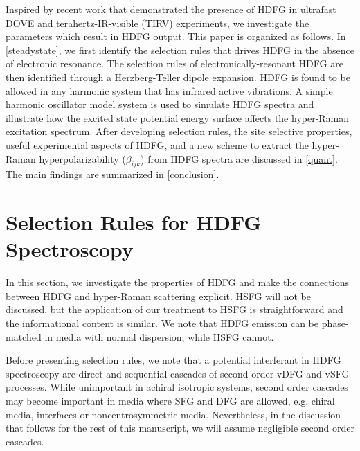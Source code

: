 \documentclass[aip, jcp, reprint, onecolumn]{revtex4-2}
\begin{document}
Inspired by recent work that demonstrated the presence of HDFG in ultrafast DOVE and terahertz-IR-visible (TIRV) experiments, we investigate the parameters which result in HDFG output. \cite{Bonn2024, McDonnell2024}
This paper is organized as follows.
In \autoref{steadystate}, we first identify the selection rules that drives HDFG in the absence of electronic resonance. 
The selection rules of electronically-resonant HDFG are then identified through a Herzberg-Teller dipole expansion.
HDFG is found to be allowed in any harmonic system that has infrared active vibrations.
A simple harmonic oscillator model system is used to simulate HDFG spectra and illustrate how the excited state potential energy surface affects the hyper-Raman excitation spectrum.
After developing selection rules, the site selective properties, useful experimental aspects of HDFG, and a new scheme to extract the hyper-Raman hyperpolarizability ($\beta_{ijk}$) from HDFG spectra are discussed in \autoref{quant}.
The main findings are summarized in \autoref{conclusion}.


\section{Selection Rules for HDFG Spectroscopy}\label{steadystate}

In this section, we investigate the properties of HDFG and make the connections between HDFG and hyper-Raman scattering explicit.
HSFG will not be discussed, but the application of our treatment to HSFG is straightforward and the informational content is similar.
We note that HDFG emission can be phase-matched in media with normal dispersion, while HSFG cannot.\cite{RN278}  

Before presenting selection rules, we note that a potential interferant in HDFG spectroscopy are direct and sequential cascades of second order vDFG and vSFG processes.\cite{RN297, RN302, RN301}
While unimportant in achiral isotropic systems,\cite{Belkin2000} second order cascades may become important in media where SFG and DFG are allowed, e.g. chiral media, interfaces or noncentrosymmetric media. 
Nevertheless, in the discussion that follows for the rest of this manuscript, we will assume negligible second order cascades. 
\end{document}
